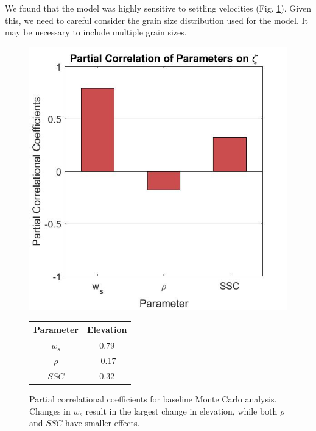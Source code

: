 \documentclass[12pt]{article}
\begin{document}
We found that the model was highly sensitive to settling velocities (Fig. \ref{fig:mc_partial_corr}). Given this, we need to careful consider the grain size distribution used for the model. It may be necessary to include multiple grain sizes.

\begin{figure}[H]
	\begin{minipage}{0.49\linewidth}
		\centering
		\includegraphics[width=\textwidth]{../figures/sens_mc.jpg}
	\end{minipage}
	\hfill
	\begin{minipage}{0.49\linewidth}
		\centering
		\setlength\tabcolsep{0pt}
		\setlength\tabcolsep{20px}
		\begin{tabular}{cc}
			\hline
			Parameter & Elevation \\ \hline
			$w_s$     & 0.79      \\
			$\rho$    & -0.17     \\
			$SSC$     & 0.32      \\ \hline
		\end{tabular}
	\end{minipage}
	\caption[Partial correlational coefficients of the sediment model]{\label{fig:mc_partial_corr} Partial correlational coefficients for baseline Monte Carlo analysis. Changes in $w_s$ result in the largest change in elevation, while both $\rho$ and $SSC$ have smaller effects.}
\end{figure}
\end{document}

